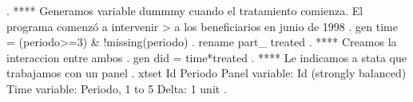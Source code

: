 . **** Generamos variable dummmy cuando el tratamiento comienza. El programa comenzó a intervenir 
> a los beneficiarios en junio de 1998
. gen time = (periodo>=3) \& !missing(periodo) 
{\smallskip}
. rename part_ treated
{\smallskip}
. **** Creamos la interaccion entre ambos
. gen did = time*treated  
{\smallskip}
. **** Le indicamos a stata que trabajamos con un panel
. xtset Id Periodo 
{\smallskip}
Panel variable: Id (strongly balanced)
 Time variable: Periodo, 1 to 5
         Delta: 1 unit
{\smallskip}
. 
